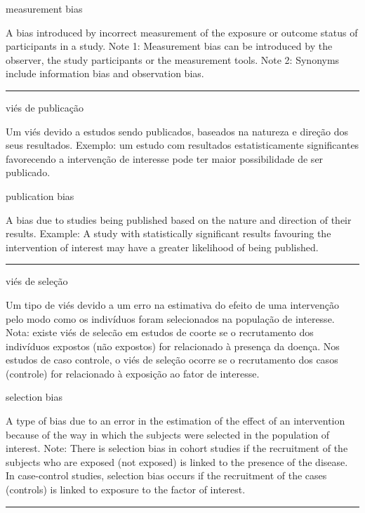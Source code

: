 \documentclass[
]{book}
\begin{document}
measurement bias

A bias introduced by incorrect measurement of the exposure or outcome status of participants in a study. Note 1: Measurement bias can be introduced by the observer, the study participants or the measurement tools. Note 2: Synonyms include information bias and observation bias.

\begin{center}\rule{0.5\linewidth}{0.5pt}\end{center}

viés de publicação

Um viés devido a estudos sendo publicados, baseados na natureza e direção dos seus resultados. Exemplo: um estudo com resultados estatisticamente significantes favorecendo a intervenção de interesse pode ter maior possibilidade de ser publicado.

publication bias

A bias due to studies being published based on the nature and direction of their results. Example: A study with statistically significant results favouring the intervention of interest may have a greater likelihood of being published.

\begin{center}\rule{0.5\linewidth}{0.5pt}\end{center}

viés de seleção

Um tipo de viés devido a um erro na estimativa do efeito de uma intervenção pelo modo como os indivíduos foram selecionados na população de interesse. Nota: existe viés de selecão em estudos de coorte se o recrutamento dos indivíduos expostos (não expostos) for relacionado à presença da doença. Nos estudos de caso controle, o viés de seleção ocorre se o recrutamento dos casos (controle) for relacionado à exposição ao fator de interesse.

selection bias

A type of bias due to an error in the estimation of the effect of an intervention because of the way in which the subjects were selected in the population of interest. Note: There is selection bias in cohort studies if the recruitment of the subjects who are exposed (not exposed) is linked to the presence of the disease. In case-control studies, selection bias occurs if the recruitment of the cases (controls) is linked to exposure to the factor of interest.

\begin{center}\rule{0.5\linewidth}{0.5pt}\end{center}
\end{document}
